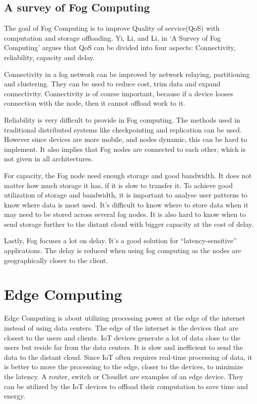 \subsection{A survey of Fog Computing} %
The goal of Fog Computing is to improve Quality of service(QoS) with computation and storage offloading. Yi, Li, and Li, in ‘A Survey of Fog Computing’\cite{yi_survey_2015} argues that QoS can be divided into four aspects: Connectivity, reliability, capacity and delay.

Connectivity in a fog network can be improved by network relaying, partitioning and clustering. They can be used to reduce cost, trim data and expand connectivity. Connectivity is of course important, because if a device looses connection with the node, then it cannot offload work to it. 

Reliability is very difficult to provide in Fog computing. The methods used in traditional distributed systems like checkpointing and replication can be used. However since devices are more mobile, and nodes dynamic, this can be hard to implement. It also implies that Fog nodes are connected to each other, which is not given in all architectures. 

For capacity, the Fog node need enough storage and good bandwidth. It does not matter how much storage it has, if it is slow to transfer it. To achieve good utilization of storage and bandwidth, it is important to analyse user patterns to know where data is most used. It’s difficult to know where to store data when it may need to be stored across several fog nodes. It is also hard to know when to send storage further to the distant cloud with bigger capacity at the cost of delay. 

Lastly, Fog focuses a lot on delay. It’s a good solution for “latency-sensitive” applications. The delay is reduced when using fog computing as the nodes are geographically closer to the client.















\section{Edge Computing}
Edge Computing is about utilizing processing power at the edge of the internet instead of using data centers. The edge of the internet is the devices that are closest to the users and clients. IoT devices generate a lot of data close to the users but reside far from the data centers. It is slow and inefficient to send the data to the distant cloud. Since IoT often requires real-time processing of data, it is better to move the processing to the edge, closer to the devices, to minimize the latency\cite{shi_edge_2016}.
A router, switch or Cloudlet are examples of an edge device. They can be utilized by the IoT devices to offload their computation to save time and energy.





